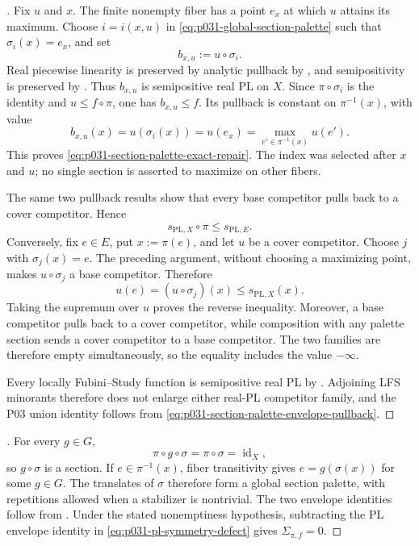 
\begin{proof}[]
Fix $u$ and $x$.  The finite nonempty fiber has a point $e_x$ at which
$u$ attains its maximum.  Choose $i=i(x,u)$ in
\eqref{eq:p031-global-section-palette} such that $\sigma_i(x)=e_x$, and set
\[
                            b_{x,u}:=u\circ\sigma_i.
\]
Real piecewise linearity is preserved by analytic pullback by
\cite[Lemma~5.4\textup{(1)}, p.~171]{GJR26}, and semipositivity is
preserved by
\cite[Proposition~7.6\textup{(1)}, p.~189]{GJR26}.  Thus $b_{x,u}$ is
semipositive real PL on $X$.  Since $\pi\circ\sigma_i$ is the identity and
$u\leq f\circ\pi$, one has $b_{x,u}\leq f$.  Its pullback is constant on
$\pi^{-1}(x)$, with value
\[
 b_{x,u}(x)=u(\sigma_i(x))=u(e_x)
          =\max_{e'\in\pi^{-1}(x)}u(e').
\]
This proves \eqref{eq:p031-section-palette-exact-repair}.  The index was
selected after $x$ and $u$; no single section is asserted to maximize on
other fibers.

The same two pullback results show that every base competitor pulls back to
a cover competitor.  Hence
\[
                 s_{\mathrm{PL},X}\circ\pi
                    \leq s_{\mathrm{PL},E}.
\]
Conversely, fix $e\in E$, put $x:=\pi(e)$, and let $u$ be a cover
competitor.  Choose $j$ with $\sigma_j(x)=e$.  The preceding argument,
without choosing a maximizing point, makes $u\circ\sigma_j$ a base
competitor.  Therefore
\[
                   u(e)=(u\circ\sigma_j)(x)
                         \leq s_{\mathrm{PL},X}(x).
\]
Taking the supremum over $u$ proves the reverse inequality.  Moreover, a
base competitor pulls back to a cover competitor, while composition with
any palette section sends a cover competitor to a base competitor.  The
two families are therefore empty simultaneously, so the equality includes
the value $-\infty$.

Every locally Fubini--Study function is semipositive real PL by
\cite[Definition~7.8 and \S7.9]{GJR26}.  Adjoining LFS minorants therefore
does not enlarge either real-PL competitor family, and the P03 union
identity follows from
\eqref{eq:p031-section-palette-envelope-pullback}.
\end{proof}

\begin{proof}[]
For every $g\in G$,
\[
                  \pi\circ g\circ\sigma
                    =\pi\circ\sigma
                    =\operatorname{id}_X,
\]
so $g\circ\sigma$ is a section.  If $e\in\pi^{-1}(x)$, fiber
transitivity gives $e=g(\sigma(x))$ for some $g\in G$.  The translates of
$\sigma$ therefore form a global section palette, with repetitions allowed
when a stabilizer is nontrivial.  The two envelope identities follow from
.  Under the stated
nonemptiness hypothesis, subtracting the PL envelope identity in
\eqref{eq:p031-pl-symmetry-defect} gives $\Sigma_{\pi,f}=0$.
\end{proof}

